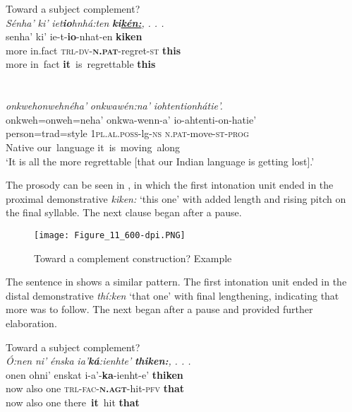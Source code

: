 \documentclass[output=paper]{langscibook}
\begin{document}
\ea%
    \label{ex:mithun:21}
    Toward a subject complement?\\
    \gllll \textit{Sénha’}  \textit{ki’}     \textit{iet}\textbf{\textit{io}}\textit{hnhá:ten} \textbf{\textit{ki\uline{kén:}}}\textit{,}    \textit{. . .}\\
 senha’    ki’      ie-t-\textbf{io}{}-nhat-en            \textbf{kiken}\\
    more    in.fact  \textsc{trl-dv-}\textbf{\textsc{n.pat}}{}-regret-\textsc{st}    \textbf{this}\\
    more    {in~fact}    {\textbf{it}~is~regrettable}            \textbf{this}\\~\\~\\
\gllll    \textit{onkwehonwehnéha’}      \textit{onkwawén:na’}      \textit{iohtentionhátie’.}\\
    onkweh=onweh=neha’  onkwa-wenn-a’      io-ahtenti-on-hatie’\\
    person=trad=style      \textsc{1pl.al.poss}{}-lg-\textsc{ns}  \textsc{n.pat}{}-move-\textsc{st-prog}\\
    Native                  {our~language}        {it~is~moving~along}\\
\glt    ‘It is all the more regrettable [that our Indian language is getting        lost].’\\
\z

The prosody can be seen in , in which the first intonation unit ended in the proximal demonstrative \textit{kiken:} ‘this one’ with added length and rising pitch on the final syllable. The next clause began after a pause.

\begin{figure}
\texttt{[image: Figure\_11\_600-dpi.PNG]}
\caption{Toward a complement construction? Example }
\label{fig:mithun:11}
\end{figure}

The sentence in  shows a similar pattern. The first intonation unit ended in the distal demonstrative \textit{thí:ken} ‘that one’ with final lengthening, indicating that more was to follow. The next began after a pause and provided further elaboration.

\newpage
\ea%
    \label{ex:mithun:22}
    Toward a subject complement?\\
   \gllll \textit{Ó:nen}    \textit{ni’}    \textit{énska}    \textit{ia’}\textbf{\textit{ká}}\textit{:ienhte’}  \textbf{\textit{thiken:}}\textit{,}  \textit{. . .}\\
    onen    ohni’  enskat    i-a’-\textbf{ka}{}-ienht-e’          \textbf{thiken}\\
    now      also    one      \textsc{trl-fac-}\textbf{\textsc{n.agt}}{}-hit-\textsc{pfv}  \textbf{that}\\
    now      also    one      {there~\textbf{it}~hit}              \textbf{that}\\~\\~\\
\end{document}
